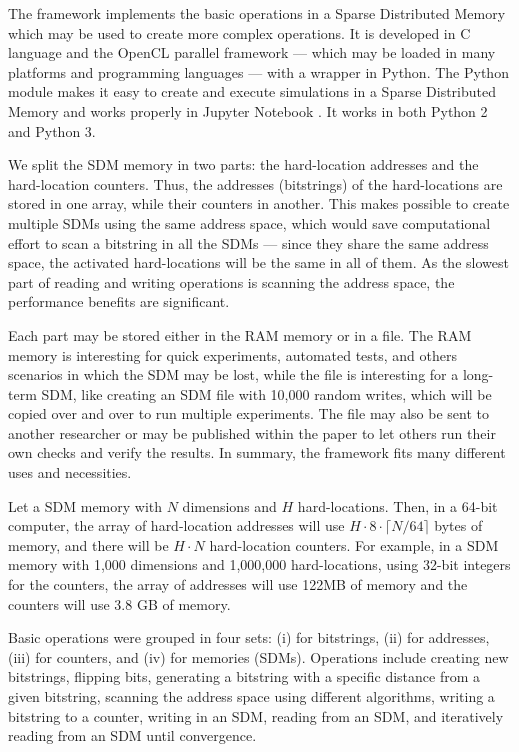 
The framework implements the basic operations in a Sparse Distributed Memory which may be used to create more complex operations. It is developed in C language and the OpenCL parallel framework --- which may be loaded in many platforms and programming languages --- with a wrapper in Python. The Python module makes it easy to create and execute simulations in a Sparse Distributed Memory and works properly in Jupyter Notebook \citep{kluyver2016jupyter}. It works in both Python 2 and Python 3.

We split the SDM memory in two parts: the hard-location addresses and the hard-location counters. Thus, the addresses (bitstrings) of the hard-locations are stored in one array, while their counters in another. This makes possible to create multiple SDMs using the same address space, which would save computational effort to scan a bitstring in all the SDMs --- since they share the same address space, the activated hard-locations will be the same in all of them. As the slowest part of reading and writing operations is scanning the address space, the performance benefits are significant.

Each part may be stored either in the RAM memory or in a file. The RAM memory is interesting for quick experiments, automated tests, and others scenarios in which the SDM may be lost, while the file is interesting for a long-term SDM, like creating an SDM file with 10,000 random writes, which will be copied over and over to run multiple experiments. The file may also be sent to another researcher or may be published within the paper to let others run their own checks and verify the results. In summary, the framework fits many different uses and necessities.

Let a SDM memory with $N$ dimensions and $H$ hard-locations. Then, in a 64-bit computer, the array of hard-location addresses will use $H \cdot 8 \cdot \lceil N/64 \rceil$ bytes of memory, and there will be $H \cdot N$ hard-location counters. For example, in a SDM memory with 1,000 dimensions and 1,000,000 hard-locations, using 32-bit integers for the counters, the array of addresses will use 122MB of memory and the counters will use 3.8 GB of memory.

Basic operations were grouped in four sets: (i) for bitstrings, (ii) for addresses, (iii) for counters, and (iv) for memories (SDMs). Operations include creating new bitstrings, flipping bits, generating a bitstring with a specific distance from a given bitstring, scanning the address space using different algorithms, writing a bitstring to a counter, writing in an SDM, reading from an SDM, and iteratively reading from an SDM until convergence.


